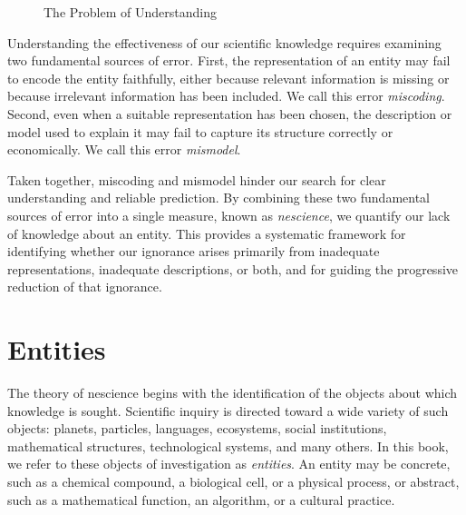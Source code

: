 \begin{figure}[t]
\centering
{}
\caption{\label{fig:representationProblem} The Problem of Understanding}
\end{figure}

Understanding the effectiveness of our scientific knowledge requires examining two fundamental sources of error. First, the representation of an entity may fail to encode the entity faithfully, either because relevant information is missing or because irrelevant information has been included. We call this error \emph{miscoding}. Second, even when a suitable representation has been chosen, the description or model used to explain it may fail to capture its structure correctly or economically. We call this error \emph{mismodel}. 

Taken together, miscoding and mismodel hinder our search for clear understanding and reliable prediction. By combining these two fundamental sources of error into a single measure, known as \emph{nescience}, we quantify our lack of knowledge about an entity. This provides a systematic framework for identifying whether our ignorance arises primarily from inadequate representations, inadequate descriptions, or both, and for guiding the progressive reduction of that ignorance.

%
%

\section{Entities}

The theory of nescience begins with the identification of the objects about which knowledge is sought. Scientific inquiry is directed toward a wide variety of such objects: planets, particles, languages, ecosystems, social institutions, mathematical structures, technological systems, and many others. In this book, we refer to these objects of investigation as \emph{entities}. An entity may be concrete, such as a chemical compound, a biological cell, or a physical process, or abstract, such as a mathematical function, an algorithm, or a cultural practice.

